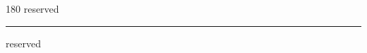 
\begin{frame}
\begin{center}
\begin{turn}{180}
{\fontsize{2.5cm}{1em}\selectfont reserved}
\end{turn}
\vspace{1em}\par  
\hrule
\vspace{1em}\par  
{\fontsize{2.5cm}{1em}\selectfont reserved}
\end{center}
\end{frame}
